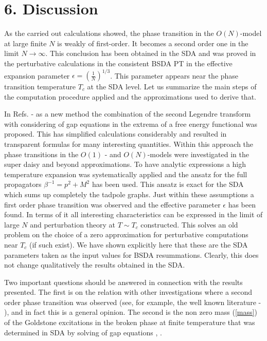 \documentclass[a4paper,12pt]{article}
\begin{document}
\section*{6. Discussion}

As the carried out calculations showed, the phase transition in the
$O(N)$-model at large finite $N$ is weakly of first-order. It becomes
a second order one in the limit $N \to \infty$. This conclusion has
been obtained in the SDA and was proved in the perturbative
calculations in the consistent BSDA PT in the effective expansion
parameter $\epsilon = (\frac{1}{N})^{1/3} $. This parameter appears
near the phase transition temperature $T_c$ at the SDA level. Let us
summarize the main steps of the computation procedure applied and the
approximations used to derive that.

In Refs.\cite{Bordag1} - \cite{pl} as a new method the combination of
the second Legendre transform with considering of gap equations in the
extrema of a free energy functional was proposed. This has simplified
calculations considerably and resulted in transparent formulas for
many interesting quantities.  Within this approach the phase
transitions in the $O(1)$ - and $O(N)$-models were investigated in the
super daisy and beyond approximations. To have analytic expressions a
high temperature expansion was systematically applied and the ansatz
for the full propagators $\beta^{- 1} = p^2 + M^2$ has been used. This
ansatz is exact for the SDA which sums up completely the tadpole
graphs.  Just within these assumptions a first order phase transition
was observed and the effective parameter $\epsilon$ has been found. In
terms of it all interesting characteristics can be expressed in the
limit of large $N$ and perturbation theory at $T \sim T_c$
constructed. This solves an old problem on the choice of a zero
approximation for perturbative computations near $T_c$ (if such
exist).  We have shown explicitly here that these are the SDA
parameters taken as the input values for BSDA resummations. Clearly,
this does not change qualitatively the results obtained in the SDA.

Two important questions should be answered  in connection with the
  results presented. The first is on the relation with other investigations
where a second order phase transition was observed (see, for example,
 the well known literature \cite {Zinn} - \cite{Fodor}), and in fact this is a
general opinion. The second is the non zero mass
(\ref{mass}) of the Goldstone excitations in the broken phase  at
finite temperature  that was determined in SDA by solving of gap
equations \cite{prd}, \cite{pl}. 
\end{document}

